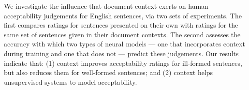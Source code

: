 We investigate the influence that document context exerts on human acceptability judgements for English sentences, via two sets of experiments. The first compares ratings for sentences presented on their own with ratings for the same set of sentences given in their document contexts.  The second assesses the accuracy with which two types of neural models --- one that incorporates context during training and one that does not --- predict these judgements.  Our results indicate that: (1) context improves acceptability ratings for ill-formed sentences, but also reduces them for well-formed sentences;  and (2) context helps unsupervised systems to model acceptability.
